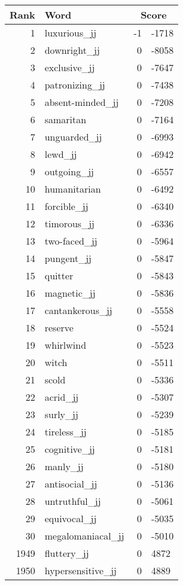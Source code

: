 \begin{longtable}[!htbp]{| rlr@{.}l |}
    \hline
    \textbf{Rank} & \textbf{Word} & \multicolumn{2}{c|}{\textbf{Score}} \\
    \hline
    \endhead
    1 & luxurious\_jj & -1 & -1718 \\
    2 & downright\_jj & 0 & -8058 \\
    3 & exclusive\_jj & 0 & -7647 \\
    4 & patronizing\_jj & 0 & -7438 \\
    5 & absent-minded\_jj & 0 & -7208 \\
    6 & samaritan & 0 & -7164 \\
    7 & unguarded\_jj & 0 & -6993 \\
    8 & lewd\_jj & 0 & -6942 \\
    9 & outgoing\_jj & 0 & -6557 \\
    10 & humanitarian & 0 & -6492 \\
    11 & forcible\_jj & 0 & -6340 \\
    12 & timorous\_jj & 0 & -6336 \\
    13 & two-faced\_jj & 0 & -5964 \\
    14 & pungent\_jj & 0 & -5847 \\
    15 & quitter & 0 & -5843 \\
    16 & magnetic\_jj & 0 & -5836 \\
    17 & cantankerous\_jj & 0 & -5558 \\
    18 & reserve & 0 & -5524 \\
    19 & whirlwind & 0 & -5523 \\
    20 & witch & 0 & -5511 \\
    21 & scold & 0 & -5336 \\
    22 & acrid\_jj & 0 & -5307 \\
    23 & surly\_jj & 0 & -5239 \\
    24 & tireless\_jj & 0 & -5185 \\
    25 & cognitive\_jj & 0 & -5181 \\
    26 & manly\_jj & 0 & -5180 \\
    27 & antisocial\_jj & 0 & -5136 \\
    28 & untruthful\_jj & 0 & -5061 \\
    29 & equivocal\_jj & 0 & -5035 \\
    30 & megalomaniacal\_jj & 0 & -5010 \\
    1949 & fluttery\_jj & 0 & 4872 \\
    1950 & hypersensitive\_jj & 0 & 4889 \\

\end{longtable}

